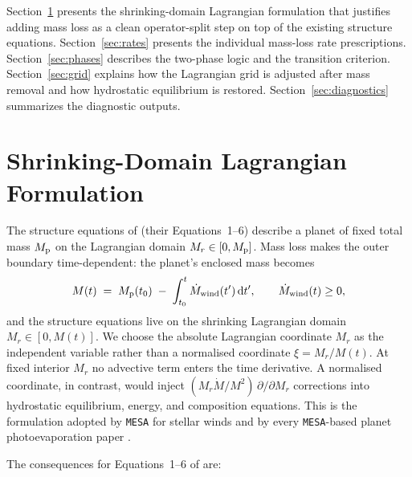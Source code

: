 \documentclass{aastex701}
\newcommand{\dd}{\mathrm{d}}
\newcommand{\Mdot}{\dot{M}}
\newcommand{\Mp}{M_{\rm p}}
\begin{document}
Section~\ref{sec:formulation} presents the shrinking-domain Lagrangian
formulation that justifies adding mass loss as a clean operator-split
step on top of the existing structure equations.
Section~\ref{sec:rates} presents the individual mass-loss rate
prescriptions.  Section~\ref{sec:phases} describes the two-phase logic
and the transition criterion.  Section~\ref{sec:grid} explains how
the Lagrangian grid is adjusted after mass removal and how
hydrostatic equilibrium is restored.
Section~\ref{sec:diagnostics} summarizes the diagnostic outputs.

\section{Shrinking-Domain Lagrangian Formulation}\label{sec:formulation}

The structure equations of \citet{TejadaArevalo2026} (their
Equations~1--6) describe a planet of fixed total mass $\Mp$ on the
Lagrangian domain $M_{r}\in[0,\Mp]$.  Mass loss makes the outer boundary
time-dependent: the planet's enclosed mass becomes
\begin{equation}\label{eq:Mt}
  M(t) \;=\; \Mp(t_{0})
  \;-\; \int_{t_{0}}^{t}\Mdot_{\rm wind}(t')\,\dd t',
  \qquad \Mdot_{\rm wind}(t)\ge 0,
\end{equation}
and the structure equations live on the shrinking Lagrangian domain
$M_{r}\in[0,M(t)]$.  We choose the absolute Lagrangian coordinate
$M_{r}$ as the independent variable rather than a normalised coordinate
$\xi = M_{r}/M(t)$.  At fixed interior $M_{r}$ no advective term enters
the time derivative.  A normalised coordinate, in contrast, would inject
$(M_{r}\Mdot/M^{2})\,\partial/\partial M_{r}$ corrections into hydrostatic
equilibrium, energy, and composition equations.  This is the
formulation adopted by \texttt{MESA} \citep{Paxton2011, Paxton2019} for
stellar winds and by every \texttt{MESA}-based planet
photoevaporation paper \citep[e.g.,][]{Lopez2013, Owen2017,
ChenRogers2016, Mordasini2020, Malsky2020, Rogers2021}.

The consequences for Equations~1--6 of \citet{TejadaArevalo2026} are:
\end{document}
